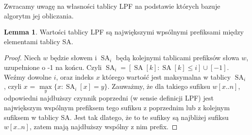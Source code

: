 \documentclass[a4paper,12pt]{article}
\theoremstyle{definition}
\newtheorem{lemma}{Lemma}[section]
\DeclareMathOperator{\SA}{SA}
\begin{document}


Zwracamy uwagę na własności tablicy LPF na podstawie których bazuje algorytm jej obliczania.

\begin{lemma}

Wartości tablicy LPF są największymi wpsólnymi prefiksami między elementami tablicy SA.

\begin{proof}

Niech $w$ będzie słowem i $\SA_{i}$ będą kolejnymi tablicami prefiksów słowa $w$, uzupełnione o -1 na końcu.
Czyli $\SA_{i} = [ \SA[k] : \SA[k] \leq i ] \cup [-1]$.
Weźmy dowolne $i$, oraz indeks $x$ którego wartość jest maksymalna w tablicy $\SA_{i}$,
 czyli $x$ = $\max\limits_{y} \{ x : \SA_{i}[x] = y \}$.
Zauważmy, że dla takiego sufiksu $w[x .. n]$, odpowiedni najdłuższy czynnik poprzedni (w sensie definicji LPF)
 jest największym wspólnym prefiksem tego sufiksu z poprzednim lub z kolejnym sufiksem w tablicy SA.
Jest tak dlatego, że to te sufiksy są najbliżej sufiksu $w[x .. n]$, zatem mają najdłuższy wspólny z nim prefix.

\end{proof}
\end{lemma}
\end{document}
